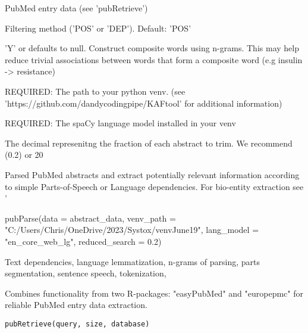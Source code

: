 \documentclass[a4paper]{book}
\begin{document}
\begin{Arguments}
\begin{ldescription}
\item[\code{data}] PubMed entry data (see 'pubRetrieve')

\item[\code{method}] Filtering method ('POS' or 'DEP'). Default: 'POS'

\item[\code{composite}] 'Y' or defaults to null. Construct composite words using n-grams. This may help reduce trivial associations between words that form a composite word (e.g insulin -> resistance)

\item[\code{venv\_path}] REQUIRED: The path to your python venv. (see 'https://github.com/dandycodingpipe/KAFtool' for additional information)

\item[\code{lang\_model}] REQUIRED: The spaCy language model installed in your venv

\item[\code{reduced\_search}] The decimal represenitng the fraction of each abstract to trim. We recommend (0.2) or 20


Parsed PubMed abstracts and extract potentially relevant information according to simple Parts-of-Speech or Language dependencies. For bio-entity extraction see '


pubParse(data = abstract\_data, venv\_path = "C:/Users/Chris/OneDrive/2023/Systox/venvJune19", lang\_model = "en\_core\_web\_lg", reduced\_search = 0.2)

Text
dependencies,
language
lemmatization,
n-grams
of
parsing,
parts
segmentation,
sentence
speech,
tokenization,
\end{ldescription}
\end{Arguments}
%
\begin{Description}\relax
Combines functionality from two R-packages: "easyPubMed" and "europepmc" for reliable PubMed entry data extraction.
\end{Description}
%
\begin{Usage}
\begin{verbatim}
pubRetrieve(query, size, database)
\end{verbatim}
\end{Usage}
\end{document}
